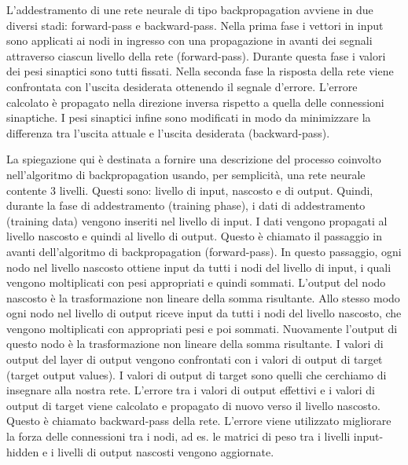 L'addestramento di une rete neurale di tipo backpropagation avviene in due diversi stadi: forward-pass e backward-pass. Nella prima fase i vettori in input sono applicati ai nodi in ingresso con una propagazione in avanti dei segnali attraverso ciascun livello della rete (forward-pass). Durante questa fase i valori dei pesi sinaptici sono tutti fissati. Nella seconda fase la risposta della rete viene confrontata con l'uscita desiderata ottenendo il segnale d'errore. L'errore calcolato è propagato nella direzione inversa rispetto a quella delle connessioni sinaptiche. I pesi sinaptici infine sono modificati in modo da minimizzare la differenza tra l'uscita attuale e l'uscita desiderata (backward-pass).

La spiegazione qui è destinata a fornire una descrizione del processo coinvolto nell'algoritmo di backpropagation usando, per semplicità, una rete neurale contente 3 livelli. Questi sono: livello di input, nascosto e di output.
Quindi, durante la fase di addestramento (training phase), i dati di addestramento (training data) vengono inseriti nel livello di input. I dati vengono propagati al livello nascosto e quindi al livello di output. Questo è chiamato il passaggio in avanti dell'algoritmo di backpropagation (forward-pass). 
In questo passaggio, ogni nodo nel livello nascosto ottiene input da tutti i nodi del livello di input, i quali vengono moltiplicati con pesi appropriati e quindi sommati. L'output del nodo nascosto è la trasformazione non lineare della somma risultante. 
Allo stesso modo ogni nodo nel livello di output riceve input da tutti i nodi del livello nascosto, che vengono moltiplicati con appropriati pesi e poi sommati. Nuovamente l'output di questo nodo è la trasformazione non lineare della somma risultante.
I valori di output del layer di output vengono confrontati con i valori di output di target (target output values).
I valori di output di target sono quelli che cerchiamo di insegnare alla nostra rete. L'errore tra i valori di output effettivi e i valori di output di target viene calcolato e propagato di nuovo verso il livello nascosto. 
Questo è chiamato backward-pass della rete. L'errore viene utilizzato migliorare la forza delle connessioni tra i nodi, ad es. le matrici di peso tra i livelli input-hidden e i livelli di output nascosti vengono aggiornate.

